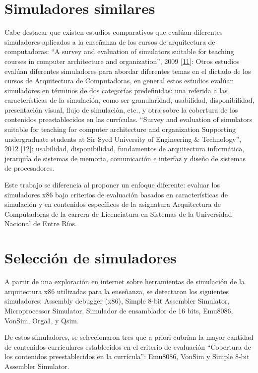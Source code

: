 \documentclass[12pt,twoside]{templates/unerthesis}
\begin{document}
\hypertarget{simuladores-similares}{%
\section{Simuladores similares}\label{simuladores-similares}}

Cabe destacar que existen estudios comparativos que evalúan diferentes simuladores aplicados a la enseñanza de los cursos de arquitectura de computadoras:
``A survey and evaluation of simulators suitable for teaching courses in computer architecture and organization'', 2009 {[}\protect\hyperlink{ref-nikolic_survey_2009}{11}{]}: Otros estudios evalúan diferentes simuladores para abordar diferentes temas en el dictado de los cursos de Arquitectura de Computadoras, en general estos estudios evalúan simuladores en términos de dos categorías predefinidas: una referida a las características de la simulación, como ser granularidad, usabilidad, disponibilidad, presentación visual, flujo de simulación, etc., y otra sobre la cobertura de los contenidos preestablecidos en las currículas.
``Survey and evaluation of simulators suitable for teaching for computer architecture and organization Supporting undergraduate students at Sir Syed University of Engineering \& Technology'', 2012 {[}\protect\hyperlink{ref-hasan_survey_2012}{12}{]}: usabilidad, disponibilidad, fundamentos de arquitectura informática, jerarquía de sistemas de memoria, comunicación e interfaz y diseño de sistemas de procesadores.

Este trabajo se diferencia al proponer un enfoque diferente: evaluar los simuladores x86 bajo criterios de evaluación basados en características de simulación y en contenidos específicos de la asignatura Arquitectura de Computadoras de la carrera de Licenciatura en Sistemas de la Universidad Nacional de Entre Ríos.

\hypertarget{selecciuxf3n-de-simuladores}{%
\section{Selección de simuladores}\label{selecciuxf3n-de-simuladores}}

A partir de una exploración en internet sobre herramientas de simulación de la arquitectura x86 utilizadas para la enseñanza, se detectaron los siguientes simuladores: Assembly debugger (x86), Simple 8-bit Assembler Simulator, Microprocessor Simulator, Simulador de ensamblador de 16 bits, Emu8086, VonSim, Orga1, y Qsim.

De estos simuladores, se seleccionaron tres que a priori cubrían la mayor cantidad de contenidos curriculares establecidos en el criterio de evaluación ``Cobertura de los contenidos preestablecidos en la currícula'': Emu8086, VonSim y Simple 8-bit Assembler Simulator.
\end{document}
